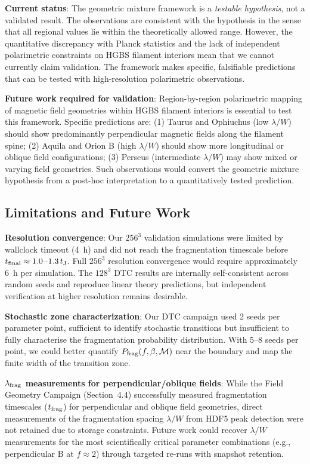 \documentclass[twoside,twocolumn]{mnras}
\begin{document}
\textbf{Current status}: The geometric mixture framework is a \textit{testable hypothesis}, not a validated result. The observations are consistent with the hypothesis in the sense that all regional values lie within the theoretically allowed range. However, the quantitative discrepancy with Planck statistics and the lack of independent polarimetric constraints on HGBS filament interiors mean that we cannot currently claim validation. The framework makes specific, falsifiable predictions that can be tested with high-resolution polarimetric observations.

\textbf{Future work required for validation}: Region-by-region polarimetric mapping of magnetic field geometries within HGBS filament interiors is essential to test this framework. Specific predictions are: (1) Taurus and Ophiuchus (low $\lambda/W$) should show predominantly perpendicular magnetic fields along the filament spine; (2) Aquila and Orion B (high $\lambda/W$) should show more longitudinal or oblique field configurations; (3) Perseus (intermediate $\lambda/W$) may show mixed or varying field geometries. Such observations would convert the geometric mixture hypothesis from a post-hoc interpretation to a quantitatively tested prediction.

\subsection{Limitations and Future Work}

\textbf{Resolution convergence}: Our $256^3$ validation simulations were limited by wallclock timeout (4~h) and did not reach the fragmentation timescale before $t_{\rm final} \approx 1.0$--$1.3\,t_{\rm J}$. Full $256^3$ resolution convergence would require approximately 6~h per simulation. The $128^3$ DTC results are internally self-consistent across random seeds and reproduce linear theory predictions, but independent verification at higher resolution remains desirable.

\textbf{Stochastic zone characterization}: Our DTC campaign used 2 seeds per parameter point, sufficient to identify stochastic transitions but insufficient to fully characterise the fragmentation probability distribution. With 5--8 seeds per point, we could better quantify $P_{\rm frag}(f, \beta, \mathcal{M})$ near the boundary and map the finite width of the transition zone.

\textbf{$\lambda_{\rm frag}$ measurements for perpendicular/oblique fields}: While the Field Geometry Campaign (Section~4.4) successfully measured fragmentation timescales ($t_{\rm frag}$) for perpendicular and oblique field geometries, direct measurements of the fragmentation spacing $\lambda/W$ from HDF5 peak detection were not retained due to storage constraints. Future work could recover $\lambda/W$ measurements for the most scientifically critical parameter combinations (e.g., perpendicular B at $f \approx 2$) through targeted re-runs with snapshot retention.
\end{document}

